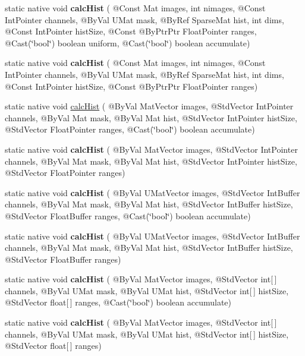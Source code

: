 \begin{DoxyCompactItemize}
\item 
static native void {\bfseries calc\+Hist} ( @Const Mat images, int nimages, @Const Int\+Pointer channels, @By\+Val U\+Mat mask, @By\+Ref Sparse\+Mat hist, int dims, @Const Int\+Pointer hist\+Size, @Const @By\+Ptr\+Ptr Float\+Pointer ranges, @Cast(\char`\"{}bool\char`\"{}) boolean uniform, @Cast(\char`\"{}bool\char`\"{}) boolean accumulate)
\item 
static native void {\bfseries calc\+Hist} ( @Const Mat images, int nimages, @Const Int\+Pointer channels, @By\+Val U\+Mat mask, @By\+Ref Sparse\+Mat hist, int dims, @Const Int\+Pointer hist\+Size, @Const @By\+Ptr\+Ptr Float\+Pointer ranges)
\item 
static native void \hyperlink{group__imgproc__hist_gaae5adf8a34c06197b68e79d8dcb9c9fd}{calc\+Hist} ( @By\+Val Mat\+Vector images, @Std\+Vector Int\+Pointer channels, @By\+Val Mat mask, @By\+Val Mat hist, @Std\+Vector Int\+Pointer hist\+Size, @Std\+Vector Float\+Pointer ranges, @Cast(\char`\"{}bool\char`\"{}) boolean accumulate)
\item 
static native void {\bfseries calc\+Hist} ( @By\+Val Mat\+Vector images, @Std\+Vector Int\+Pointer channels, @By\+Val Mat mask, @By\+Val Mat hist, @Std\+Vector Int\+Pointer hist\+Size, @Std\+Vector Float\+Pointer ranges)
\item 
static native void {\bfseries calc\+Hist} ( @By\+Val U\+Mat\+Vector images, @Std\+Vector Int\+Buffer channels, @By\+Val Mat mask, @By\+Val Mat hist, @Std\+Vector Int\+Buffer hist\+Size, @Std\+Vector Float\+Buffer ranges, @Cast(\char`\"{}bool\char`\"{}) boolean accumulate)
\item 
static native void {\bfseries calc\+Hist} ( @By\+Val U\+Mat\+Vector images, @Std\+Vector Int\+Buffer channels, @By\+Val Mat mask, @By\+Val Mat hist, @Std\+Vector Int\+Buffer hist\+Size, @Std\+Vector Float\+Buffer ranges)
\item 
static native void {\bfseries calc\+Hist} ( @By\+Val Mat\+Vector images, @Std\+Vector int\mbox{[}$\,$\mbox{]} channels, @By\+Val U\+Mat mask, @By\+Val U\+Mat hist, @Std\+Vector int\mbox{[}$\,$\mbox{]} hist\+Size, @Std\+Vector float\mbox{[}$\,$\mbox{]} ranges, @Cast(\char`\"{}bool\char`\"{}) boolean accumulate)
\item 
static native void {\bfseries calc\+Hist} ( @By\+Val Mat\+Vector images, @Std\+Vector int\mbox{[}$\,$\mbox{]} channels, @By\+Val U\+Mat mask, @By\+Val U\+Mat hist, @Std\+Vector int\mbox{[}$\,$\mbox{]} hist\+Size, @Std\+Vector float\mbox{[}$\,$\mbox{]} ranges)
\item 

\end{DoxyCompactItemize}
